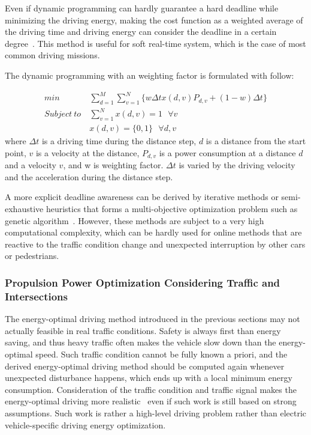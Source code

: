 Even if dynamic programming can hardly guarantee a hard deadline while minimizing the driving energy, making the cost function as a weighted average of the driving time and driving energy can consider the deadline in a certain degree~\cite{Dib:IVPPC11,Dib:OGST12,Mensing:TR13,Lin:CCA14}. This method is useful for soft real-time system, which is the case of most common driving missions.

The dynamic programming with an weighting factor is formulated with follow:

\begin{align} \label{eq:dynamic_programming}
min ~& \sum_{d=1}^{M}\sum_{v=1}^{N}\{w \Delta t x(d,v)P_{d,v} + (1-w)\Delta t \}\\
Subject~to ~& \sum_{v=1}^{N}x(d,v) = 1~~~\forall v \nonumber \\
~&x(d,v) = \{0, 1\} ~~~\forall d, v \nonumber
\end{align}
%
where $\Delta t$ is a driving time during the distance step, $d$ is a distance from the start point, $v$ is a velocity at the distance, $P_{d,v}$ is a power consumption at a distance $d$ and a velocity $v$, and w is weighting factor. $\Delta t$ is varied by the driving velocity and the acceleration during the distance step.

A more explicit deadline awareness can be derived by iterative methods or semi-exhaustive heuristics that forms a multi-objective optimization problem such as genetic algorithm~\cite{Kachroudi:TVT12,Dovgana:ASC14}. However, these methods are subject to a very high computational complexity, which can be hardly used for online methods that are reactive to the traffic condition change and unexpected interruption by other cars or pedestrians.

\subsubsection{Propulsion Power Optimization Considering Traffic and Intersections} \label{subsubsec:opt_traffic}

The energy-optimal driving method introduced in the previous sections may not actually feasible in real traffic conditions. Safety is always first than energy saving, and thus heavy traffic often makes the vehicle slow down than the energy-optimal speed. Such traffic condition cannot be fully known a priori, and the derived energy-optimal driving method should be computed again whenever unexpected disturbance happens, which ends up with a local minimum energy consumption. Consideration of the traffic condition and traffic signal makes the energy-optimal driving more realistic~\cite{Mensing:TR13,Lim:TVT17,Mandava:ITSC09,Asadi:TCST11,Ozatay:CDC13,Nunzio:JRNC15,Wu:ITS15}  even if such work is still based on strong assumptions. Such work is rather a high-level driving problem rather than electric vehicle-specific driving energy optimization.

